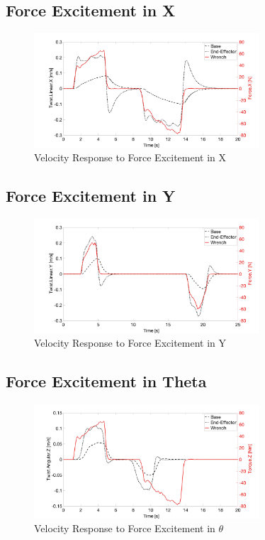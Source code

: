 \subsection{Force Excitement in X}
\begin{figure}
   \centering
   \includegraphics[width=0.75\textwidth]{images/test18_x.jpg}
   \caption{Velocity Response to Force Excitement in X}
   \label{pics:test18_x}
\end{figure}

\subsection{Force Excitement in Y}
\begin{figure}
   \centering
   \includegraphics[width=0.75\textwidth]{images/test18_y.jpg}
   \caption{Velocity Response to Force Excitement in Y}
   \label{pics:test18_y}
\end{figure}
\subsection{Force Excitement in Theta}
\begin{figure}
   \centering
   \includegraphics[width=0.75\textwidth]{images/test18_theta.jpg}
   \caption{Velocity Response to Force Excitement in $\theta$}
   \label{pics:test18_theta}
\end{figure}

